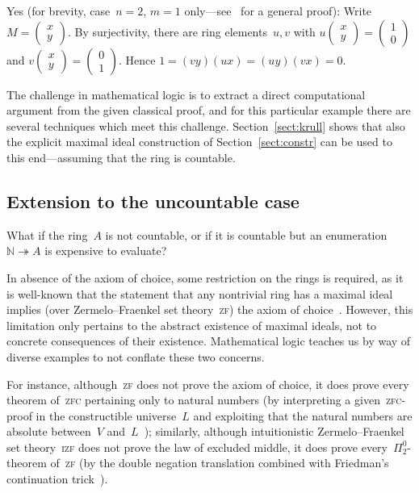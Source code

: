 \documentclass[com,11pt,crcready]{iosart2x}
\theoremstyle{definition}
\theoremstyle{plain}
\theoremstyle{remark}
\newcommand{\?}{\,{:}\,}
\newcommand{\NN}{\mathbb{N}}
\renewcommand{\_}{\mathpunct{.}\,}
\begin{document}
Yes (for brevity, case~$n = 2$, $m = 1$ only---see~\cite{richman:trivial-rings} for a general proof): Write~$M =
\left(\begin{smallmatrix}x\\y\end{smallmatrix}\right)$. By surjectivity,
there are ring elements~$u, v$ with
$
  u \left(\begin{smallmatrix}x\\y\end{smallmatrix}\right) = \left(\begin{smallmatrix}1\\0\end{smallmatrix}\right)
$
and
$
  v \left(\begin{smallmatrix}x\\y\end{smallmatrix}\right) = \left(\begin{smallmatrix}0\\1\end{smallmatrix}\right)
$.
Hence $1 = (vy) (ux) = (uy) (vx) = 0$.

The challenge in mathematical logic is to extract a direct computational
argument from the given classical proof, and for this particular example
there are several techniques which meet this challenge. Section~\ref{sect:krull} shows that
also the explicit maximal ideal construction of Section~\ref{sect:constr} can be used to this end---assuming
that the ring is countable.


\subsection*{Extension to the uncountable case}

What if the ring~$A$ is not countable, or if it is countable but
an enumeration~$\NN \twoheadrightarrow A$ is expensive to
evaluate?

In absence of the axiom of choice, some restriction on the
rings is required, as it is well-known that the statement that any nontrivial
ring has a maximal ideal implies (over Zermelo--Fraenkel set
theory~\textsc{zf}) the axiom of choice~\cite{scott:prime-ideals,hodges:krull,banaschewski:krull,erne:krull,howard-rubin:ac}.
However, this limitation only pertains to the abstract existence of maximal
ideals, not to concrete consequences of their existence. Mathematical
logic teaches us by way of diverse examples to not conflate these two concerns.

For
instance, although~\textsc{zf} does not prove the axiom of choice, it does
prove every theorem of~\textsc{zfc} pertaining only to natural numbers (by
interpreting a given~\textsc{zfc}-proof in the constructible universe~$L$
and exploiting that the natural numbers are absolute between~$V$
and~$L$~\cite{goedel:ac-gch,schoenfield:predicativity}); similarly, although intuitionistic Zermelo--Fraenkel set
theory~\textsc{izf} does not prove the law of excluded middle, it does prove
every~$\Pi^0_2$-theorem of~\textsc{zf} (by the double negation translation
combined with Friedman's continuation trick~\cite{friedman:double-negation-translation}).
\end{document}
